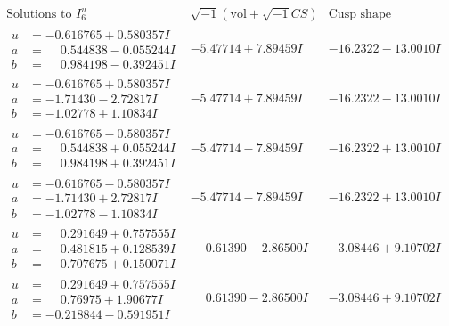\documentclass[1p]{elsarticle_modified}
\theoremstyle{definition}
\newcommand{\I}{\sqrt{-1}}
\begin{document}
$$\begin{array}{c|c|c}  
\text{Solutions to }I^u_{6}& \I (\text{vol} + \sqrt{-1}CS) & \text{Cusp shape}\\
 \hline 
\begin{aligned}
u &= -0.616765 + 0.580357 I \\
a &= \phantom{-}0.544838 - 0.055244 I \\
b &= \phantom{-}0.984198 - 0.392451 I\end{aligned}
 & -5.47714 + 7.89459 I & -16.2322 - 13.0010 I \\ \hline\begin{aligned}
u &= -0.616765 + 0.580357 I \\
a &= -1.71430 - 2.72817 I \\
b &= -1.02778 + 1.10834 I\end{aligned}
 & -5.47714 + 7.89459 I & -16.2322 - 13.0010 I \\ \hline\begin{aligned}
u &= -0.616765 - 0.580357 I \\
a &= \phantom{-}0.544838 + 0.055244 I \\
b &= \phantom{-}0.984198 + 0.392451 I\end{aligned}
 & -5.47714 - 7.89459 I & -16.2322 + 13.0010 I \\ \hline\begin{aligned}
u &= -0.616765 - 0.580357 I \\
a &= -1.71430 + 2.72817 I \\
b &= -1.02778 - 1.10834 I\end{aligned}
 & -5.47714 - 7.89459 I & -16.2322 + 13.0010 I \\ \hline\begin{aligned}
u &= \phantom{-}0.291649 + 0.757555 I \\
a &= \phantom{-}0.481815 + 0.128539 I \\
b &= \phantom{-}0.707675 + 0.150071 I\end{aligned}
 & \phantom{-}0.61390 - 2.86500 I & -3.08446 + 9.10702 I \\ \hline\begin{aligned}
u &= \phantom{-}0.291649 + 0.757555 I \\
a &= \phantom{-}0.76975 + 1.90677 I \\
b &= -0.218844 - 0.591951 I\end{aligned}
 & \phantom{-}0.61390 - 2.86500 I & -3.08446 + 9.10702 I \\ \hline\begin{aligned}

\end{aligned}
\end{array}$$
\end{document}

